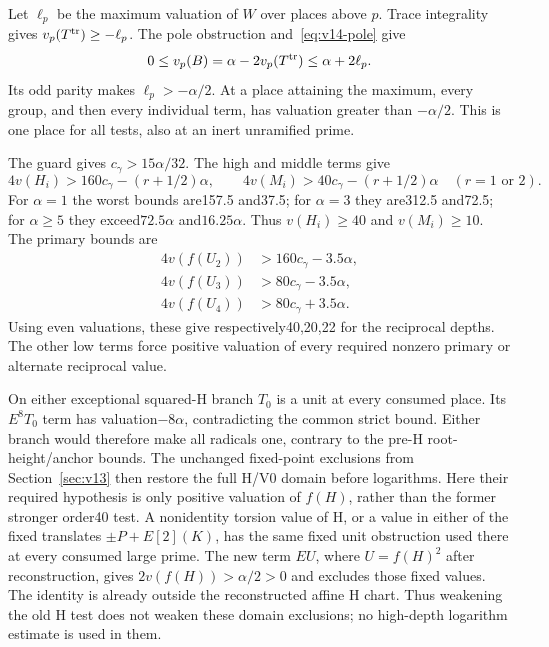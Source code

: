 Let $\ell_p$ be the maximum valuation of $W$ over places above
$p$. Trace integrality gives $v_p(T^{\rm tr})\geq-\ell_p$.
The pole obstruction and~\eqref{eq:v14-pole} give
\[
 0\leq v_p(B)=\alpha-2v_p(T^{\rm tr})\leq\alpha+2\ell_p.
\]
Its odd parity makes $\ell_p>-\alpha/2$. At a place attaining
the maximum, every group, and then every individual term,
has valuation greater than $-\alpha/2$. This is one place for
all tests, also at an inert unramified prime.

The guard gives $c_\gamma>15\alpha/32$. The high and middle
terms give
\[
 4v(H_i)>160c_\gamma-(r+1/2)\alpha,\qquad
 4v(M_i)>40c_\gamma-(r+1/2)\alpha\quad(r=1\text{ or }2).
\]
For $\alpha=1$ the worst bounds are157.5 and37.5; for
$\alpha=3$ they are312.5 and72.5; for $\alpha\geq5$ they
exceed$72.5\alpha$ and$16.25\alpha$. Thus $v(H_i)\geq40$
and $v(M_i)\geq10$. The primary bounds are
\[
 \begin{split}
 4v(f(U_2))&>160c_\gamma-3.5\alpha,\\
 4v(f(U_3))&>80c_\gamma-3.5\alpha,\\
 4v(f(U_4))&>80c_\gamma+3.5\alpha.
 \end{split}
\]
Using even valuations, these give respectively40,20,22 for the
reciprocal depths. The other low terms force positive valuation
of every required nonzero primary or alternate reciprocal value.

On either exceptional squared-H branch $T_0$ is a unit at every
consumed place. Its $E^8T_0$ term has valuation$-8\alpha$,
contradicting the common strict bound. Either branch would
therefore make all radicals one, contrary to the pre-H
root-height/anchor bounds. The unchanged fixed-point exclusions
from Section~\ref{sec:v13} then restore the full H/V0 domain
before logarithms. Here their required hypothesis is only
positive valuation of $f(H)$, rather than the former stronger
order40 test. A nonidentity torsion value of H, or a value
in either of the fixed translates $\pm P+E[2](K)$, has the
same fixed unit obstruction used there at every consumed
large prime. The new term $EU$, where $U=f(H)^2$ after
reconstruction, gives $2v(f(H))>\alpha/2>0$ and excludes
those fixed values. The identity is already outside the
reconstructed affine H chart. Thus weakening the old H test
does not weaken these domain exclusions; no high-depth
logarithm estimate is used in them.

